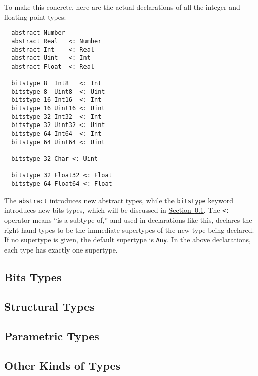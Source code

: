 \documentclass{article}
\renewcommand{\sec}[1]{\label{sec:#1}}
\newcommand{\Section}[1]{\hyperref[sec:#1]{Section~\ref*{sec:#1}}}
\begin{document}
To make this concrete, here are the actual declarations of all the integer and floating point types:
\begin{verbatim}
  abstract Number
  abstract Real   <: Number
  abstract Int    <: Real
  abstract Uint   <: Int
  abstract Float  <: Real

  bitstype 8  Int8   <: Int
  bitstype 8  Uint8  <: Uint
  bitstype 16 Int16  <: Int
  bitstype 16 Uint16 <: Uint
  bitstype 32 Int32  <: Int
  bitstype 32 Uint32 <: Uint
  bitstype 64 Int64  <: Int
  bitstype 64 Uint64 <: Uint

  bitstype 32 Char <: Uint

  bitstype 32 Float32 <: Float
  bitstype 64 Float64 <: Float
\end{verbatim}
The \verb|abstract| introduces new abstract types, while the \verb|bitstype| keyword introduces new bits types, which will be discussed in \Section{bits-types}.
The \verb|<:| operator means ``is a subtype of,'' and used in declarations like this, declares the right-hand types to be the immediate supertypes of the new type being declared.
If no supertype is given, the default supertype is \verb|Any|.
In the above declarations, each type has exactly one supertype.


\subsection{Bits Types}\sec{bits-types}

\subsection{Structural Types}\sec{structural-types}

\subsection{Parametric Types}\sec{parametric-types}

\subsection{Other Kinds of Types}\sec{other-kinds-of-types}
\end{document}
